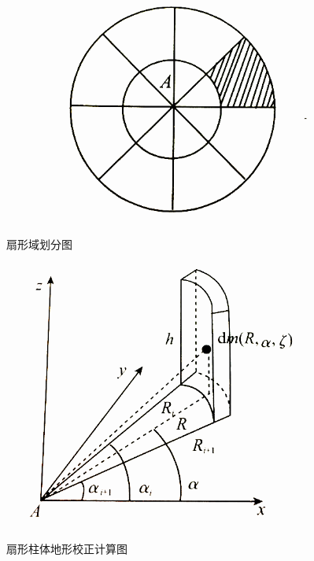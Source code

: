 \begin{enumerate}
	\begin{figure}[htbp]
		\centering
		{
			\begin{minipage}{7cm}
				\centering
				\label{扇形域划分图}
				\includegraphics[scale = 0.7]{figures/dixingjiaozhengyuanli.png}
				\caption{扇形域划分图}
			\end{minipage}
		}
		{
			\begin{minipage}{7cm}
				\centering
				\label{扇形柱体地形校正计算图}
				\includegraphics[scale = 0.7]{figures/zhongyuanqu.png}
				\caption{扇形柱体地形校正计算图}
			\end{minipage}
		}
	\end{figure}
	

\end{enumerate}
